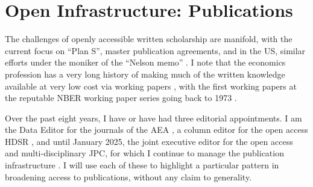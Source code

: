 \documentclass{article}
\begin{document}
%


\section{Open Infrastructure: Publications}
\label{sec:publications}

The challenges of openly accessible written scholarship are manifold, with the current focus on ``Plan S'', master publication agreements, and in the US, similar efforts under the moniker of the ``Nelson memo'' \parencite{brainard_white_2022,brainard_us_2024}. I note that the economics profession has a very long history of making much of the written knowledge available at very low cost via working papers \parencite{vilhuber_reproducibility_2020}, with the first working papers at the reputable NBER working paper series going back to 1973 \parencite{welch_education_1973}.

Over the past eight years, I have or have had three editorial appointments. I am the Data Editor for the journals of the \acf{AEA} \citep{10.1257/pandp.108.745},  a column editor for the open access \ac{HDSR} \citep{vilhuberReinforcingReproducibilityReplicability2023}, and until January 2025, the joint executive editor for the open access and multi-disciplinary \ac{JPC}, for which I continue to manage the publication infrastructure \citep{abowd_changes_2025}. I will use each of these to highlight a particular pattern in broadening access to publications, without any claim to generality. 
\end{document}
